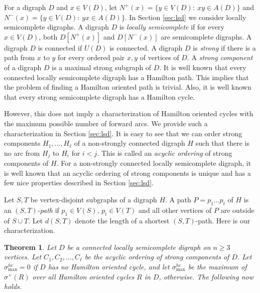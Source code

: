 \documentclass{article}
\newtheorem{theorem}{Theorem}[section]
\newcommand{\AYn}[1]{{#1}}
\newcommand{\GGn}[1]{{#1}}
\newcommand{\YLn}[1]{{#1}}
\newcommand{\GGnn}[1]{{#1}}
\newcommand{\2}{\vspace{0.2cm}}
\begin{document}
\GGn{For a digraph $D$ and $x\in V(D)$, let $N^+(x)=\{y\in V(D):\ xy\in A(D)\}$ and $N^-(x)=\{y\in V(D):\ yx\in A(D)\}.$
In Section \ref{sec:lsd} we consider locally semicomplete digraphs.
A digraph $D$ is {\em locally semicomplete} if for every $x\in V(D)$, both $D[N^+(x)]$ and $D[N^-(x)]$ are semicomplete digraphs.
A digraph $D$ is connected if $U(D)$ is connected.
A digraph $D$ is {\em strong} if there is a path from $x$ to $y$ for every ordered pair $x,y$ of vertices of $D$.
A {\em strong component} of a digraph $D$ is a maximal strong subgraph of $D$.
It is well known \cite{B90,B} that every connected locally semicomplete digraph has a Hamilton path.
This implies that the problem of finding a Hamilton oriented path is trivial.
Also, it is well known \cite{B90,B} that every strong semicomplete digraph has a Hamilton cycle.

However, this does not imply a characterization of Hamilton oriented cycles with \AYn{the maximum possible} number of forward arcs.
We provide such a characterization in Section \ref{sec:lsd}.
It is easy to see that we can order strong components $H_1,\dots ,H_{\ell}$ of a non-strongly connected digraph $H$  such that there is no arc from \AYn{$H_j$ to $H_i$} for $i<j$.
This is called an {\em acyclic ordering} of strong components of $H$.
For a non-strongly connected locally semicomplete digraph, it is well known \cite{B90,B} that an acyclic ordering of strong components is unique and has a few nice properties described in Section \ref{sec:lsd}.

Let $S,T$ be vertex-disjoint subgraphs of a digraph $H$. A path $P=p_1\dots p_t$ of $H$ is an $(S,T)$-{\em path} if $p_1\in \YLn{V(S)}$, $p_t\in \YLn{V(T)}$ and all other vertices of $P$ are outside of $S\cup T$. Let $d(S,T)$ denote the length of a shortest $(S,T)$-path.
Here is our characterization.


\begin{theorem}\label{thm: hoc in LSD}
Let $D$ be a connected locally semicomplete digraph on $n\ge 3$ vertices. Let $C_1, C_2,\dots, C_{\ell}$ be the acyclic ordering of strong components of $D$.
\GGnn{Let $\sigma^{hc}_{\max}=0$ if $D$ has no Hamilton oriented cycle}, and let $\sigma^{hc}_{\max}$ be the \GGnn{maximum of $\sigma^+(R)$ over all Hamilton oriented cycles} $R$ in $D$, \GGnn{otherwise}. The following now holds.


\end{theorem}}
\end{document}
